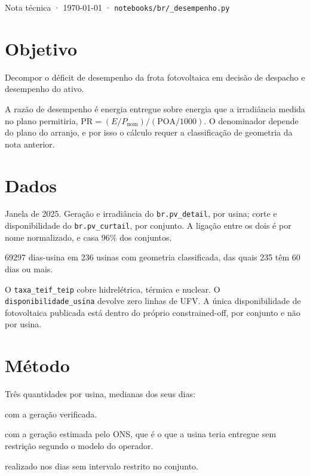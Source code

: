\documentclass[10pt,a4paper,oneside,twocolumn]{book}
\begin{document}
         {Nota técnica · \today{} ·
          \texttt{notebooks/br/\_desempenho.py}}

\section*{Objetivo}

Decompor o déficit de desempenho da frota fotovoltaica em decisão de despacho e
desempenho do ativo.

A razão de desempenho é energia entregue sobre energia que a irradiância medida
no plano permitiria, $\mathrm{PR}=(E/P_{\mathrm{nom}})/(\mathrm{POA}/1000)$. O
denominador depende do plano do arranjo, e por isso o cálculo requer a
classificação de geometria da nota anterior.

\section*{Dados}

Janela de 2025. Geração e irradiância do \texttt{br.pv\_detail}, por usina;
corte e disponibilidade do \texttt{br.pv\_curtail}, por conjunto. A ligação
entre os dois é por nome normalizado, e casa 96\% dos conjuntos.

\begin{ficha}
  \item[Amostra] \num{69297} dias-usina em 236 usinas com geometria
                 classificada, das quais 235 têm 60 dias ou mais.
\end{ficha}

 O
\texttt{taxa\_teif\_teip} cobre hidrelétrica, térmica e nuclear. O
\texttt{disponibilidade\_usina} devolve zero linhas de UFV. A única
disponibilidade de fotovoltaica publicada está dentro do próprio
constrained-off, por conjunto e não por usina.

\section*{Método}

Três quantidades por usina, medianas dos seus dias:

\begin{ficha}
  \item[Realizado] com a geração verificada.
  \item[Potencial] com a geração estimada pelo ONS, que é o que a usina teria
                   entregue sem restrição segundo o modelo do operador.
  \item[Sem corte] realizado nos dias sem intervalo restrito no conjunto.
\end{ficha}
\end{document}
